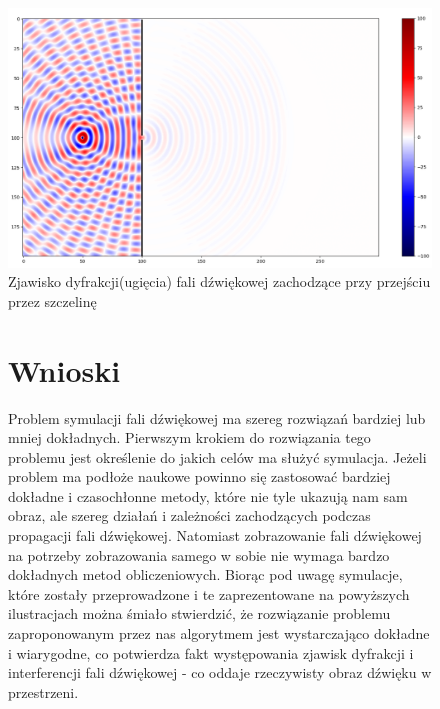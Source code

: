 \documentclass[a4paper, 12pt]{article}
\begin{document}
\begin{figure}
\includegraphics[scale=0.55]{no5.png}
\caption{Zjawisko dyfrakcji(ugięcia) fali dźwiękowej zachodzące przy przejściu przez szczelinę}
\end{figure}



\begin{figure}
\section{Wnioski}

Problem symulacji fali dźwiękowej ma szereg rozwiązań bardziej lub mniej dokładnych. Pierwszym krokiem do rozwiązania tego problemu jest określenie do jakich celów ma służyć symulacja. Jeżeli problem ma podłoże naukowe powinno się zastosować bardziej dokładne i czasochłonne metody, które nie tyle ukazują nam sam obraz, ale szereg działań i zależności zachodzących podczas propagacji fali dźwiękowej. Natomiast zobrazowanie fali dźwiękowej na potrzeby zobrazowania samego w sobie nie wymaga bardzo dokładnych metod obliczeniowych. Biorąc pod uwagę symulacje, które zostały przeprowadzone i te zaprezentowane na powyższych ilustracjach można śmiało stwierdzić, że rozwiązanie problemu zaproponowanym przez nas algorytmem jest wystarczająco dokładne i wiarygodne, co potwierdza fakt występowania zjawisk dyfrakcji i interferencji fali dźwiękowej - co oddaje rzeczywisty obraz dźwięku w przestrzeni.

\end{figure}
\end{document}
